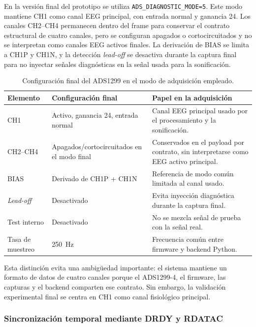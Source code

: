 En la versión final del prototipo se utiliza \texttt{ADS\_DIAGNOSTIC\_MODE=5}. Este modo mantiene CH1 como canal EEG principal, con entrada normal y ganancia 24. Los canales CH2--CH4 permanecen dentro del frame para conservar el contrato estructural de cuatro canales, pero se configuran apagados o cortocircuitados y no se interpretan como canales EEG activos finales. La derivación de BIAS se limita a CH1P y CH1N, y la detección \textit{lead-off} se desactiva durante la captura final para no inyectar señales diagnósticas en la señal usada para la sonificación.

\begin{table}[H]
    \centering
    \caption{Configuración final del ADS1299 en el modo de adquisición empleado.}
    \label{tab:impl_ads1299_modo_final}
    \begin{tabular}{p{}p{}p{}}
        \hline
        \textbf{Elemento} & \textbf{Configuración final} & \textbf{Papel en la adquisición} \\
        \hline
        CH1 & Activo, ganancia 24, entrada normal & Canal EEG principal usado por el procesamiento y la sonificación. \\
        CH2--CH4 & Apagados/cortocircuitados en el modo final & Conservados en el payload por contrato, sin interpretarse como EEG activo principal. \\
        BIAS & Derivado de CH1P + CH1N & Referencia de modo común limitada al canal usado. \\
        \textit{Lead-off} & Desactivado & Evita inyección diagnóstica durante la captura final. \\
        Test interno & Desactivado & No se mezcla señal de prueba con la señal real. \\
        Tasa de muestreo & \SI{250}{\hertz} & Frecuencia común entre firmware y backend Python. \\
        \hline
    \end{tabular}
\end{table}

Esta distinción evita una ambigüedad importante: el sistema mantiene un formato de datos de cuatro canales porque el ADS1299-4, el firmware, las capturas y el backend comparten ese contrato. Sin embargo, la validación experimental final se centra en CH1 como canal fisiológico principal.

\subsubsection{Sincronización temporal mediante DRDY y RDATAC}

